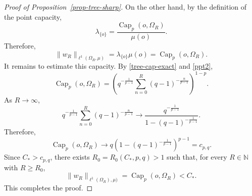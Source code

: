 \documentclass[twoside,12pt,letter]{article}
\theoremstyle{plain}
\theoremstyle{definition}
\theoremstyle{remark}
\numberwithin{equation}{section}
\begin{document}
\begin{proof}[Proof of Proposition~\ref{prop-tree-sharp}]
On the other hand, by the definition of the point capacity,
\[
\lambda_{\{o\}}
=
\frac{\operatorname{Cap}_p(o,\Omega_R)}{\mu(o)}.
\]
Therefore,
\[
\|w_R\|_{\ell^1(\Omega_R,\mu)}
=
\lambda_{\{o\}}\mu(o)
=
\operatorname{Cap}_p(o,\Omega_R).
\]
It remains to estimate this capacity. By \eqref{tree-cap-exact} and \eqref{ppt2}, 
\[
\operatorname{Cap}_p(o,\Omega_R)
=
\left(
q^{-\frac{1}{p-1}}
\sum_{n=0}^{R}
(q-1)^{-\frac{n}{p-1}}
\right)^{1-p}.
\]
As \(R\to\infty\),
\[
q^{-\frac{1}{p-1}}
\sum_{n=0}^{R}
(q-1)^{-\frac{n}{p-1}}
\longrightarrow
\frac{q^{-\frac{1}{p-1}}}
{1-(q-1)^{-\frac{1}{p-1}}}.
\]
Therefore,
\[
\operatorname{Cap}_p(o,\Omega_R)
\longrightarrow
q\left(1-(q-1)^{-\frac{1}{p-1}}\right)^{p-1}
=
c_{p,q}.
\]
Since \(C_*>c_{p,q}\), there exists \(R_0=R_0(C_*,p,q)>1\) such that, for
every \(R\in\mathbb{N}\) with \(R\ge R_0\),
\[
\|w_R\|_{\ell^1(\Omega_R),\mu)}
=
\operatorname{Cap}_p(o,\Omega_R)
<
C_*.
\]
This completes the proof.
\end{proof}
\end{document}
